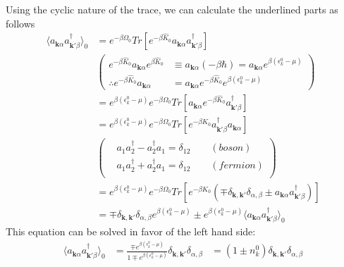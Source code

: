 Using the cyclic nature of the trace, we can calculate the underlined parts as follows
$$
\begin{aligned}
\langle a_{\mathbf{k}\alpha} a_{\mathbf{k'}\beta}^{\dagger}\rangle_{0}&=e^{-\beta\Omega_{0}} Tr \left[ e^{-\beta\hat{K}_{0}} a_{\mathbf{k}\alpha } a_{\mathbf{k'}\beta}^{\dagger} \right]\\
&\left(
\begin{aligned}
e^{-\beta\hat{K}_{0}}a_{\mathbf{k}\alpha}e^{\beta\hat{K}_{0}}& \equiv a_{\mathbf{k}\alpha}(-\beta\hbar) =a_{\mathbf{k}\alpha}e^{\beta(\epsilon_{k}^{0}-\mu)}\\
\therefore e^{-\beta\hat{K}_{0}}a_{\mathbf{k}\alpha}&= a_{\mathbf{k}\alpha} e^{-\beta\hat{K}_{0}} e^{\beta(\epsilon_{k}^{0}-\mu)}
\end{aligned}
\right)\\
&=e^{\beta(\epsilon_{k}^{0}-\mu)}e^{-\beta\Omega_{0}} Tr \left[a_{\mathbf{k}\alpha } e^{-\beta\hat{K}_{0}} a_{\mathbf{k'}\beta}^{\dagger} \right]\\
&=e^{\beta(\epsilon_{k}^{0}-\mu)}e^{-\beta\Omega_{0}} Tr \left[e^{-\beta\hat{K}_{0}} a_{\mathbf{k'}\beta}^{\dagger} a_{\mathbf{k}\alpha}\right]\\
&\left(
\begin{aligned}
&a_{1}a_{2}^{\dagger}-a_{2}^{\dagger}a_{1}=\delta_{12}\qquad(boson)\\
&a_{1}a_{2}^{\dagger}+a_{2}^{\dagger}a_{1}=\delta_{12}\qquad(fermion)\\
\end{aligned}
\right)\\
&=e^{\beta(\epsilon_{k}^{0}-\mu)}e^{-\beta\Omega_{0}} Tr \left[e^{-\beta\hat{K}_{0}} \left( \mp\delta_{\mathbf{k},\mathbf{k'}}\delta_{\alpha,\beta}\pm a_{\mathbf{k}\alpha } a_{\mathbf{k'}\beta}^{\dagger} \right)\right]\\
&=\mp\delta_{\mathbf{k},\mathbf{k'}}\delta_{\alpha,\beta} e^{\beta(\epsilon_{k}^{0}-\mu)} \pm e^{\beta(\epsilon_{k}^{0}-\mu)}
\langle a_{\mathbf{k}\alpha} a_{\mathbf{k'}\beta}^{\dagger}\rangle_{0}
\end{aligned}
$$
This equation can be solved in favor of the left hand side:
\begin{equation}
\begin{aligned}
\langle a_{\mathbf{k}\alpha} a_{\mathbf{k'}\beta}^{\dagger}\rangle_{0}&=\frac{\mp e^{\beta(\epsilon_{k}^{0}-\mu)}}{1\mp e^{\beta(\epsilon_{k}^{0}-\mu)}} \delta_{\mathbf{k},\mathbf{k'}}\delta_{\alpha,\beta}
&=(1\pm n_{k}^{0})\delta_{\mathbf{k},\mathbf{k'}}\delta_{\alpha,\beta}
\end{aligned}
\end{equation}

